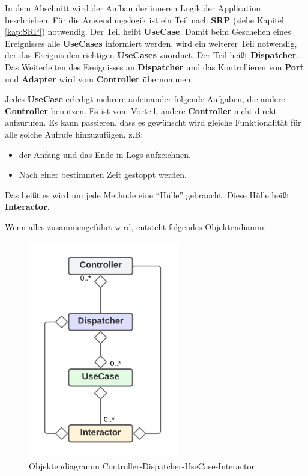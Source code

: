 In dem Abschnitt wird der Aufbau der inneren Logik der Application beschrieben. 
Für die Anwendungslogik ist ein Teil nach \textbf{SRP} (siehe Kapitel \ref{kap:SRP}) notwendig. 
Der Teil heißt \textbf{UseCase}.
Damit beim Geschehen eines Ereignisses alle \textbf{UseCases} informiert werden, 
wird ein weiterer Teil notwendig, der das Ereignis den richtigen \textbf{UseCases} zuordnet.  
Der Teil heißt \textbf{Dispatcher}.
Das Weiterleiten des Ereignisses an \textbf{Dispatcher} und das Kontrollieren von \textbf{Port} und \textbf{Adapter} wird 
vom \textbf{Controller} übernommen.

Jedes \textbf{UseCase} erledigt mehrere aufeinander folgende Aufgaben, die andere \textbf{Controller} benutzen.
Es ist vom Vorteil, andere \textbf{Controller} nicht direkt aufzurufen. 
Es kann passieren, dass es gewünscht wird gleiche Funktionalität für alle solche Aufrufe hinzuzufügen, z.B:
\begin{itemize}
    \item der Anfang und das Ende in Logs aufzeichnen.
    \item Nach einer bestimmten Zeit gestoppt werden.
\end{itemize}
Das heißt es wird um jede Methode eine ``Hülle'' gebraucht. Diese Hülle heißt \textbf{Interactor}.

Wenn alles zusammengeführt wird, entsteht folgendes Objektendiamm:

\begin{figure}[H]
    \centering
    \includegraphics[width=6.5cm]{./images/Controller-Dispatcher-UseCase-Interactor.png}
     \caption[Objektendiagramm Controller-Dispatcher-UseCase-Interactor]{Objektendiagramm Controller-Dispatcher-UseCase-Interactor}
     \label{fig:CDCDUI}
\end{figure}
